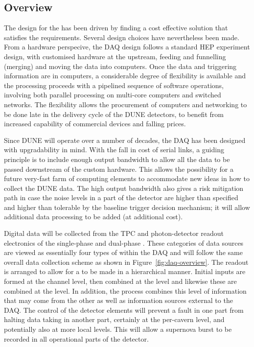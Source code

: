 \subsection{Overview}
\label{sec:fd-daq-ltr}



The design for the  has been driven by finding a cost
effective solution that satisfies the requirements. Several design
choices have nevertheless been made. 
From a hardware perspecive, the DAQ design follows a standard HEP
experiment design, with customised hardware at the upstream, feeding
and funnelling (merging) and moving the data into computers. 
Once the data and triggering information are in computers, a
considerable degree of flexibility is available and the processing
proceeds with a pipelined sequence of software operations, involving
both parallel processing on multi-core computers and switched
networks. The flexibility allows the procurement of computers and
networking to be done late in the delivery cycle of the DUNE
detectors, to benefit from increased capability of commercial devices
and falling prices.

Since DUNE will operate over a number of decades, the DAQ has been
designed with upgradability in mind.  With the fall in cost of serial
links, a guiding principle is to include enough output bandwidth to
allow all the data to be passed downstream of the custom hardware.
This allows the possibility for a future very-fast farm of computing
elements to accommodate new ideas in how to collect the DUNE data.  The
high output bandwidth also gives a risk mitigation path in case the
noise levels in a part of the detector are higher than specified and
higher than tolerable by the baseline trigger decision mechanism; it
will allow additional data processing to be added (at additional cost).

Digital data will be collected from the TPC and photon-detector
readout electronics of the single-phase and dual-phase
. 
These categories of data sources are viewed as essentially four types
of  within the DAQ and will follow the same overall
data collection scheme as shown in Figure~\ref{fig:daq-overview}. 
The readout is arranged to allow for a  to be made
in a hierarchical manner. 
Initial inputs are formed at the channel level, then combined at the
 level and likewise these are combined at the
 level.
In addition, the  process combines this level of
information that may come from the other  as well as
information sources external to the DAQ. 
The control of the detector elements will prevent a fault in one part
from halting data taking in another part, certainly at the per-cavern
level, and potentially also at more local levels. 
This will allow a supernova burst to be recorded in all operational
parts of the detector.

